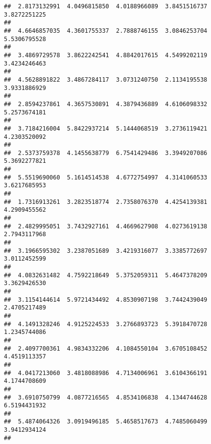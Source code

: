 \documentclass[]{article}
\begin{document}
\begin{verbatim}
##  2.8173132991  4.0496815850  4.0188966089  3.8451516737  3.8272251225 
##                                                                       
##  4.6646857035  4.3601755337  2.7888746155  3.0846253704  5.5306795528 
##                                                                       
##  3.4869729578  3.8622242541  4.8842017615  4.5499202119  3.4234246463 
##                                                                       
##  4.5628891822  3.4867284117  3.0731240750  2.1134195538  3.9331886929 
##                                                                       
##  2.8594237861  4.3657530891  4.3879436889  4.6106098332  5.2573674181 
##                                                                       
##  3.7184216004  5.8422937214  5.1444068519  3.2736119421  4.2303520092 
##                                                                       
##  2.5373759378  4.1455638779  6.7541429486  3.3949207086  5.3692277821 
##                                                                       
##  5.5519690060  5.1614514538  4.6772754997  4.3141060533  3.6217685953 
##                                                                       
##  1.7316913261  3.2823518774  2.7358076370  4.4254139381  4.2909455562 
##                                                                       
##  2.4829995051  3.7432927161  4.4669627908  4.0273619138  2.7943117968 
##                                                                       
##  3.1966595302  3.2387051689  3.4219316077  3.3385772697  3.0112452599 
##                                                                       
##  4.0832631482  4.7592218649  5.3752059311  5.4647378209  3.3629426530 
##                                                                       
##  3.1154144614  5.9721434492  4.8530907198  3.7442439049  2.4705217489 
##                                                                       
##  4.1491328246  4.9125224533  3.2766893723  5.3918470728  1.2345744086 
##                                                                       
##  2.4097700361  4.9834332206  4.1084550104  3.6705108452  4.4519113357 
##                                                                       
##  4.0417213060  3.4818088986  4.7134006961  3.6104366191  4.1744708609 
##                                                                       
##  3.6910750799  4.0877216565  4.8534106838  4.1344744628  6.5194431932 
##                                                                       
##  5.4874064326  3.0919496185  5.4658517673  4.7485060499  3.9412934124 
##                                                                       

\end{verbatim}
\end{document}
